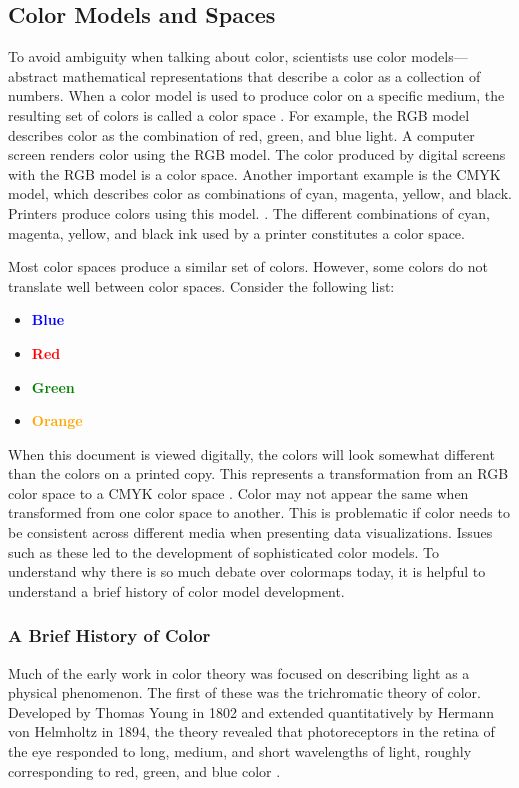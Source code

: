 \documentclass[journal,12pt]{IEEEtran}
\begin{document}
\subsection{Color Models and Spaces}

To avoid ambiguity when talking about color, scientists use
color models---abstract mathematical representations that
describe a color as a collection of numbers.
When a color model is used to produce color on a specific medium, the resulting set
of colors is called a color space \cite{colorimetry}. For example, the RGB model
describes color as the combination of red, green, and
blue light. A computer screen renders color using the
RGB model. The color produced by digital screens
with the RGB model is a color space. Another important example is the
CMYK model, which describes color as combinations of
cyan, magenta, yellow, and black. Printers produce colors using this model.
\cite{colormapping}. The different combinations of cyan, magenta, yellow, and black
ink used by a printer constitutes a color space.

Most color spaces produce a similar set of colors. However, some colors
do not translate well between color spaces. Consider the following list:
\begin{itemize}
\item \textcolor{blue}{\textbf{Blue}}
\item \textcolor{red}{\textbf{Red}}
\item \textcolor{green}{\textbf{Green}}
\item \textcolor{orange}{\textbf{Orange}}
\end{itemize}
When this document is viewed digitally, the colors will look somewhat
different than the colors on a printed copy. This represents
a transformation from an RGB color space to a CMYK color space \cite{colorvblackwhite}.
Color may not appear the same when transformed from one color space to another.
This is problematic if color needs to be consistent across
different media when presenting data visualizations. Issues such as these led
to the development of sophisticated color models. To understand why there is so much debate
over colormaps today, it is helpful to understand a brief history of color model development.

\subsubsection{A Brief History of Color}

Much of the early work in color theory was focused on describing light as a physical phenomenon.
The first of these was the trichromatic theory of color. 
Developed by Thomas Young in 1802 and extended quantitatively by 
Hermann von Helmholtz in 1894, the theory revealed that photoreceptors
in the retina of the eye responded to long, medium, and short wavelengths of light, 
roughly corresponding to red, green, and blue color \cite{colorimetry}.
\end{document}
